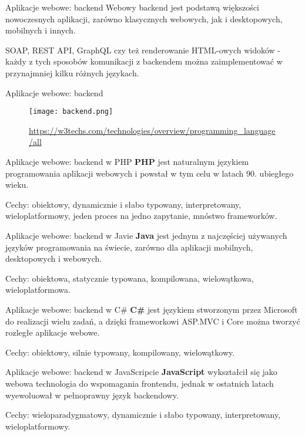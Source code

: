 \begin{frame}{Aplikacje webowe: backend}		
	Webowy backend jest podstawą większości nowoczesnych aplikacji, zarówno klasycznych webowych, jak i desktopowych, mobilnych i innych.
	
	SOAP, REST API, GraphQL czy też renderowanie HTML-owych widoków - każdy z tych sposobów komunikacji z backendem można zaimplementować w przynajmniej kilku różnych językach.
\end{frame}

\begin{frame}{Aplikacje webowe: backend}		
	\begin{figure}
		\centering
		\texttt{[image: backend.png]}
		\caption{\url{https://w3techs.com/technologies/overview/programming_language/all}}
	\end{figure}
\end{frame}

\begin{frame}{Aplikacje webowe: backend w PHP}		
	\textbf{PHP} jest naturalnym językiem programowania aplikacji webowych i powstał w tym celu w latach 90. ubiegłego wieku. 
	
	Cechy: obiektowy, dynamicznie i słabo typowany, interpretowany, wieloplatformowy, jeden proces na jedno zapytanie, mnóstwo frameworków.
\end{frame}

\begin{frame}{Aplikacje webowe: backend w Javie}		
	\textbf{Java} jest jednym z najczęściej używanych języków programowania na świecie, zarówno dla aplikacji mobilnych, desktopowych i webowych.
	
	Cechy: obiektowa, statycznie typowana, kompilowana, wielowątkowa, wieloplatformowa.
\end{frame}

\begin{frame}{Aplikacje webowe: backend w C\#}		
	\textbf{C\#} jest językiem stworzonym przez Microsoft do realizacji wielu zadań, a dzięki frameworkowi ASP.MVC i Core można tworzyć rozległe aplikacje webowe.
	
	Cechy: obiektowy, silnie typowany, kompilowany, wielowątkowy.
\end{frame}

\begin{frame}{Aplikacje webowe: backend w JavaScripcie}		
	\textbf{JavaScript} wykształcił się jako webowa technologia do wspomagania frontendu, jednak w ostatnich latach wyewoluował w pełnoprawny język backendowy.
	
	Cechy: wieloparadygmatowy, dynamicznie i słabo typowany, interpretowany, wieloplatformowy.
\end{frame}

